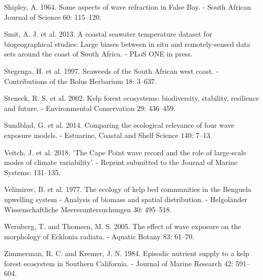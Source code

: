 \documentclass[10pt,a4,]{article}
\begin{document}
\leavevmode\hypertarget{ref-Shipley1964}{}%
Shipley, A. 1964. Some aspects of wave refraction in False Bay. - South
African Journal of Science 60: 115--120.

\leavevmode\hypertarget{ref-Smit2013}{}%
Smit, A. J. et al. 2013. A coastal seawater temperature dataset for
biogeographical studies: Large biases between in situ and
remotely-sensed data sets around the coast of South Africa. - PLoS ONE
in press.

\leavevmode\hypertarget{ref-Stegenga1997}{}%
Stegenga, H. et al. 1997. Seaweeds of the South African west coast. -
Contributions of the Bolus Herbarium 18: 3--637.

\leavevmode\hypertarget{ref-Steneck2002}{}%
Steneck, R. S. et al. 2002. Kelp forest ecosystems: biodiversity,
stability, resilience and future. - Environmental Conservation 29:
436--459.

\leavevmode\hypertarget{ref-Sundblad2014}{}%
Sundblad, G. et al. 2014. Comparing the ecological relevance of four
wave exposure models. - Estuarine, Coastal and Shelf Science 140: 7--13.

\leavevmode\hypertarget{ref-Veitch2018}{}%
Veitch, J. et al. 2018. 'The Cape Point wave record and the role of
large-scale modes of climate variability'. - Reprint submitted to the
Journal of Marine Systems: 131--135.

\leavevmode\hypertarget{ref-Velimirov1977}{}%
Velimirov, B. et al. 1977. The ecology of kelp bed communities in the
Benguela upwelling system - Analysis of biomass and spatial
distribution. - Helgoländer Wissenschaftliche Meeresuntersuchungen 30:
495--518.

\leavevmode\hypertarget{ref-Wernberg2005}{}%
Wernberg, T. and Thomsen, M. S. 2005. The effect of wave exposure on the
morphology of Ecklonia radiata. - Aquatic Botany 83: 61--70.

\leavevmode\hypertarget{ref-Zimmerman1984}{}%
Zimmerman, R. C. and Kremer, J. N. 1984. Episodic nutrient supply to a
kelp forest ecosystem in Southern California. - Journal of Marine
Research 42: 591--604.
\end{document}
